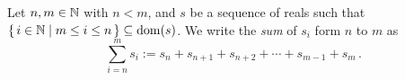 \guard



\begin{defn}
\label{defn:sumOfSequence}
  Let $n,m\in\mathbb{N}$ with $n<m$, and $s$ be a sequence of reals such that $\left\{\,i\in\mathbb{N}\mid m\leq i\leq n\,\right\}\subseteq \mathrm{dom}(s)$.
  We write the \emph{sum} of $s_i$ form $n$ to $m$ as \[ \sum_{i=n}^m s_i := s_n + s_{n+1} + s_{n+2} + \cdots + s_{m-1} + s_m\,.\]
\end{defn}

